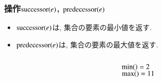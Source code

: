 \documentclass[main]{subfiles}
\begin{document}
\begin{frame}\frametitle{操作$\mathrm{successor}(e)$, $\mathrm{predecessor}(e)$}
\begin{itemize}
	\item $\mathrm{successor}(e)$は, 集合の要素の最小値を返す.\\
	\item $\mathrm{predecessor}(e)$は, 集合の要素の最大値を返す.\\
\end{itemize}

\begin{columns}[c]
	\begin{column}{0.5\linewidth}
		
	\end{column}
	\begin{column}{0.49\linewidth}
		$\mathrm{min}() = 2$\\
		$\mathrm{max}() = 11$\\
	\end{column}
\end{columns}
\end{frame}
\end{document}
